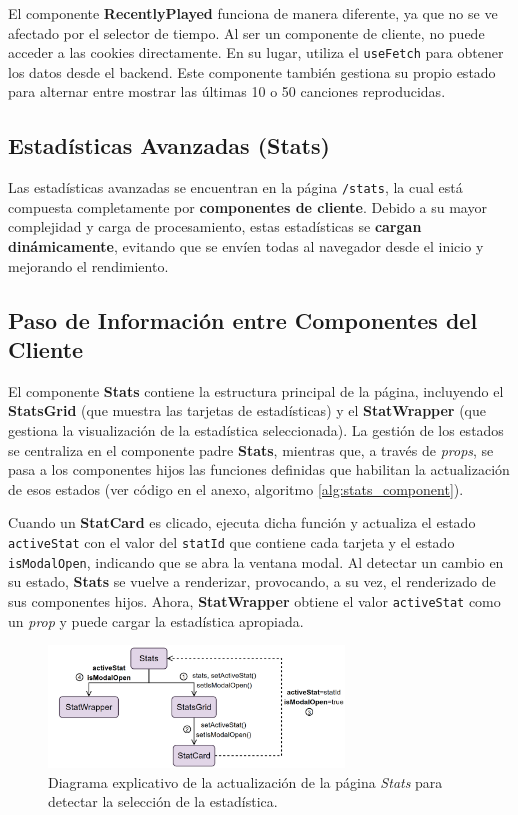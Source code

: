 El componente \textbf{RecentlyPlayed} funciona de manera diferente, ya que no se ve afectado por el selector de tiempo. Al ser un componente de cliente, no puede acceder a las cookies directamente. En su lugar, utiliza el \texttt{useFetch} para obtener los datos desde el backend. Este componente también gestiona su propio estado para alternar entre mostrar las últimas 10 o 50 canciones reproducidas.

\subsection{Estadísticas Avanzadas (Stats)}

Las estadísticas avanzadas se encuentran en la página \texttt{/stats}, la cual está compuesta completamente por \textbf{componentes de cliente}. Debido a su mayor complejidad y carga de procesamiento, estas estadísticas se \textbf{cargan dinámicamente}, evitando que se envíen todas al navegador desde el inicio y mejorando el rendimiento.

\subsection*{Paso de Información entre Componentes del Cliente}

El componente \textbf{Stats} contiene la estructura principal de la página, incluyendo el \textbf{StatsGrid} (que muestra las tarjetas de estadísticas) y el \textbf{StatWrapper} (que gestiona la visualización de la estadística seleccionada). La gestión de los estados se centraliza en el componente padre \textbf{Stats}, mientras que, a través de \textit{props}, se pasa a los componentes hijos las funciones definidas que habilitan la actualización de esos estados (ver código en el anexo, algoritmo \ref{alg:stats_component}).

Cuando un \textbf{StatCard} es clicado, ejecuta dicha función y actualiza el estado \texttt{activeStat} con el valor del \texttt{statId} que contiene cada tarjeta y el estado \texttt{isModalOpen}, indicando que se abra la ventana modal. Al detectar un cambio en su estado, \textbf{Stats} se vuelve a renderizar, provocando, a su vez, el renderizado de sus componentes hijos. Ahora, \textbf{StatWrapper} obtiene el valor \texttt{activeStat} como un \textit{prop} y puede cargar la estadística apropiada.

\begin{figure}[H]
    \centering
    \includegraphics[width=0.7\textwidth]{figures/implementacion/actualizacion_stats.png}
    \vspace{10pt}
    \caption{Diagrama explicativo de la actualización de la página \textit{Stats} para detectar la selección de la estadística.}
    \label{fig:actualizacion_stats}
\end{figure}

